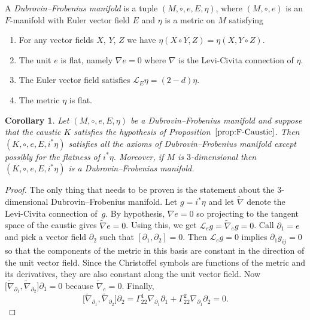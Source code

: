 \documentclass[10pt,a4paper]{amsart}
\numberwithin{equation}{section}
\newtheorem{Corollary}[Theorem]{Corollary}
\begin{document}
\begin{Definition}
 \label{def:Dubrovin--FrobeniusManifold}
 A \emph{Dubrovin--Frobenius manifold} is a tuple $(M,\circ,e,E,\eta)$, where $(M,\circ,e)$ is an $F$-manifold with Euler vector field $E$ and $\eta$ is a metric on $M$ satisfying
 \begin{enumerate}\itemsep=0pt
 \item For any vector fields $X$, $Y$, $Z$ we have $\eta(X\circ Y,Z)=\eta(X,Y\circ Z)$.
 \item The unit $e$ is flat, namely $\nabla e=0$ where $\nabla$ is the Levi-Civita connection of $\eta$.
 \item The Euler vector field satisfies $\mathcal{L}_{E}\eta=(2-d)\eta$.
 \item The metric $\eta$ is flat.
 \end{enumerate}
 \end{Definition}
\begin{Corollary}
 Let $(M,\circ,e,E,\eta)$ be a Dubrovin--Frobenius manifold and suppose that the caustic $K$ satisfies the hypothesis of Proposition~$\ref{prop:F-Caustic}$. Then $(K,\circ,e,E,i^{*}\eta)$ satisfies all the axioms of Dubrovin--Frobenius manifold except possibly for the flatness of $i^{*}\eta$. Moreover, if $M$ is $3$-dimensional then $(K,\circ,e,E,i^{*}\eta)$ is a Dubrovin--Frobenius manifold.
\end{Corollary}
\begin{proof}
 The only thing that needs to be proven is the statement about the $3$-dimensional Dubrovin--Frobenius manifold. Let $g=i^{*}\eta$ and let $\tilde{\nabla}$ denote the Levi-Civita connection of~$g$. By hypothesis, $\nabla e=0$ so projecting to the tangent space of the caustic gives $\tilde{\nabla} e=0$. Using this, we get $\mathcal{L}_{e}g=\tilde{\nabla}_{e}g=0$. Call $\partial_{1}=e$ and pick a vector field $\partial_{2}$ such that $[\partial_{1},\partial_{2}]=0$. Then $\mathcal{L}_{e}g=0$ implies $\partial_{1}g_{ij}=0$ so that the components of the metric in this basis are constant in the direction of the unit vector field. Since the Christoffel symbols are functions of the metric and its derivatives, they are also constant along the unit vector field. Now $\big[\tilde{\nabla}_{\partial_{1}},\tilde{\nabla}_{\partial_{2}}\big]\partial_{1}=0$ because $\tilde{\nabla}_{e}=0$. Finally,
 \begin{equation*}
 \big[\tilde{\nabla}_{\partial_{1}},\tilde{\nabla}_{\partial_{2}}\big]\partial_{2}=\Gamma_{22}^{1}
 \nabla_{\partial_{1}}\partial_{1}+\Gamma_{22}^{2}\nabla_{\partial_{1}}\partial_{2}=0.\tag*{\qed}
 \end{equation*}\renewcommand{\qed}{}
 \end{proof}
\end{document}
